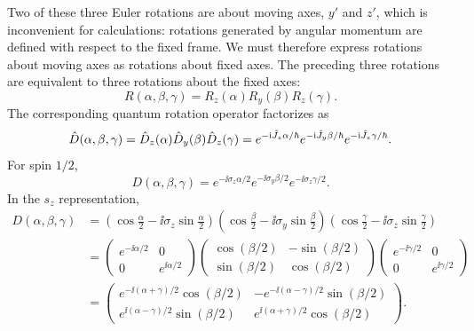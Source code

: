 Two of these three Euler rotations are about moving axes, $y'$ and $z'$, which is inconvenient for calculations: rotations generated by angular momentum are defined with respect to the fixed frame. We must therefore express rotations about moving axes as rotations about fixed axes. The preceding three rotations are equivalent to three rotations about the fixed axes:
\begin{equation}
R(\alpha,\beta,\gamma)=R_z(\alpha)R_y(\beta)R_z(\gamma).
\end{equation}
The corresponding quantum rotation operator factorizes as
\begin{equation}
\hat{D}(\alpha,\beta,\gamma)
=\hat{D}_z(\alpha)\hat{D}_y(\beta)\hat{D}_z(\gamma)
=e^{-\mathrm{i}\hat{J}_z\alpha/\hbar}e^{-\mathrm{i}\hat{J}_y\beta/\hbar}
e^{-\mathrm{i}\hat{J}_z\gamma/\hbar}.
\end{equation}
For spin $1/2$,
\begin{equation}
D(\alpha,\beta,\gamma)=e^{-\ii\sigma_z\alpha/2}
e^{-\ii\sigma_y\beta/2}e^{-\ii\sigma_z\gamma/2}.
\end{equation}
In the $s_z$ representation,
\begin{equation}\begin{aligned}
D(\alpha,\beta,\gamma)
&=\left(\cos\frac\alpha2-\ii\sigma_z\sin\frac\alpha2\right)
\left(\cos\frac\beta2-\ii\sigma_y\sin\frac\beta2\right)
\left(\cos\frac\gamma2-\ii\sigma_z\sin\frac\gamma2\right)\\
&=\begin{pmatrix}e^{-\ii\alpha/2}&0\\0&e^{\ii\alpha/2}\end{pmatrix}
\begin{pmatrix}\cos(\beta/2)&-\sin(\beta/2)\\\sin(\beta/2)&\cos(\beta/2)\end{pmatrix}
\begin{pmatrix}e^{-\ii\gamma/2}&0\\0&e^{\ii\gamma/2}\end{pmatrix}\\
&=\begin{pmatrix}
e^{-\ii(\alpha+\gamma)/2}\cos(\beta/2)&-e^{-\ii(\alpha-\gamma)/2}\sin(\beta/2)\\
e^{\ii(\alpha-\gamma)/2}\sin(\beta/2)&e^{\ii(\alpha+\gamma)/2}\cos(\beta/2)
\end{pmatrix}.
\end{aligned}\end{equation}
